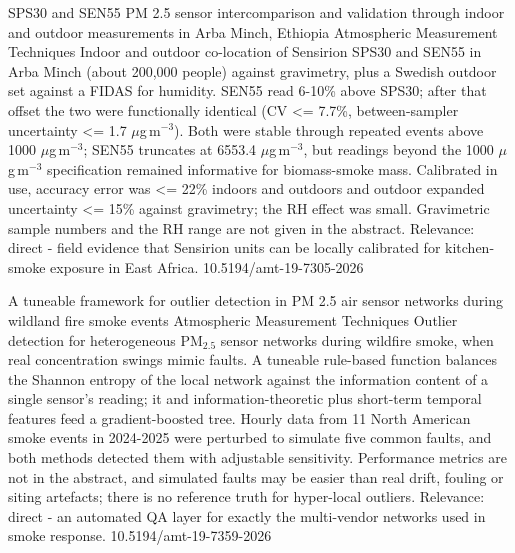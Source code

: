 \documentclass[10pt]{article}
\begin{document}
{SPS30 and SEN55 PM 2.5 sensor intercomparison and validation through indoor and outdoor measurements in Arba Minch, Ethiopia}
{Atmospheric Measurement Techniques}
{Indoor and outdoor co-location of Sensirion SPS30 and SEN55 in Arba Minch (about 200,000 people) against gravimetry, plus a Swedish outdoor set against a FIDAS for humidity. SEN55 read 6-10\% above SPS30; after that offset the two were functionally identical (CV <= 7.7\%, between-sampler uncertainty <= 1.7 $\mu$g\,m$^{-3}$). Both were stable through repeated events above 1000 $\mu$g\,m$^{-3}$; SEN55 truncates at 6553.4 $\mu$g\,m$^{-3}$, but readings beyond the 1000 $\mu$g\,m$^{-3}$ specification remained informative for biomass-smoke mass. Calibrated in use, accuracy error was <= 22\% indoors and outdoors and outdoor expanded uncertainty <= 15\% against gravimetry; the RH effect was small. Gravimetric sample numbers and the RH range are not given in the abstract. Relevance: direct - field evidence that Sensirion units can be locally calibrated for kitchen-smoke exposure in East Africa.}
{10.5194/amt-19-7305-2026}

{A tuneable framework for outlier detection in PM 2.5 air sensor networks during wildland fire smoke events}
{Atmospheric Measurement Techniques}
{Outlier detection for heterogeneous PM$_{2.5}$ sensor networks during wildfire smoke, when real concentration swings mimic faults. A tuneable rule-based function balances the Shannon entropy of the local network against the information content of a single sensor's reading; it and information-theoretic plus short-term temporal features feed a gradient-boosted tree. Hourly data from 11 North American smoke events in 2024-2025 were perturbed to simulate five common faults, and both methods detected them with adjustable sensitivity. Performance metrics are not in the abstract, and simulated faults may be easier than real drift, fouling or siting artefacts; there is no reference truth for hyper-local outliers. Relevance: direct - an automated QA layer for exactly the multi-vendor networks used in smoke response.}
{10.5194/amt-19-7359-2026}

\par{}\baselineskip{}\baselineskip
{}
\end{document}
